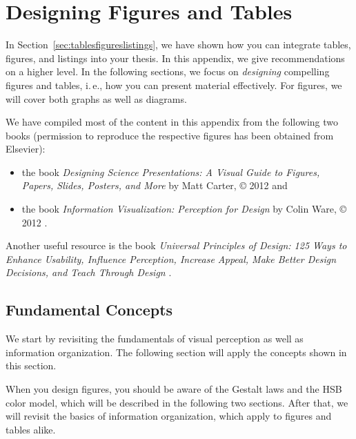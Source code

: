  
\chapter{Designing Figures and Tables}
\label{cha:designingfigtab}
\label{appendixb}

In Section~\ref{sec:tablesfigureslistings}, we have shown how you can integrate tables, figures, and listings into your thesis. In this appendix, we give recommendations on a higher level. In the following sections, we focus on \emph{designing} compelling figures and tables, i.\,e., how you can present material effectively. For figures, we will cover both graphs as well as diagrams.

We
have compiled most of the content in this appendix from the following two books (permission to reproduce the respective figures has been obtained from Elsevier):
\begin{itemize}
  \item the book \emph{Designing Science Presentations: A Visual Guide to Figures, Papers, Slides, Posters, and More} by Matt Carter, © 2012 \cite{Carter12} and
  \item the book \emph{Information Visualization: Perception for Design} by Colin Ware, © 2012 \cite{Ware12}.
\end{itemize}

Another useful resource is the book \emph{Universal Principles of Design: 125 Ways to Enhance Usability, Influence Perception, Increase Appeal, Make Better Design Decisions, and Teach Through Design} \cite{Lidwell10}.
  
\section{Fundamental Concepts}

We start by revisiting the fundamentals of visual perception as well as information organization. The following section will apply the concepts shown in this section.

When you design figures, you should be aware of the Gestalt laws and the HSB color model, which will be described in the following two sections. After that, we will revisit the basics of information organization, which apply to figures and tables alike.

